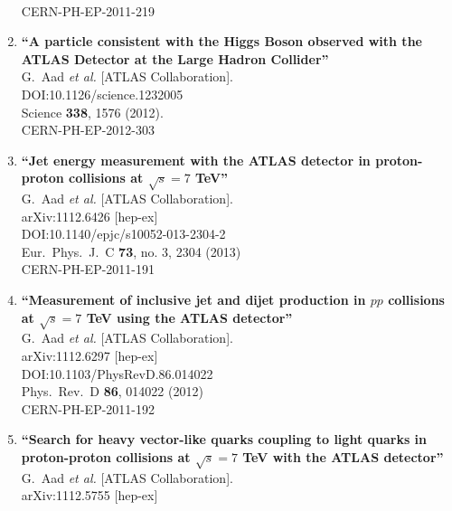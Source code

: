 \documentclass{article}
\begin{document}
\begin{enumerate}
  \\{}CERN-PH-EP-2011-219
\item%
{\bf ``A particle consistent with the Higgs Boson observed with the ATLAS Detector at the Large Hadron Collider''}
  \\{}G.~Aad {\it et al.} [ATLAS Collaboration].
  \\{}DOI:10.1126/science.1232005
  \\{}Science {\bf 338}, 1576 (2012).
  \\{}CERN-PH-EP-2012-303
\item%
{\bf ``Jet energy measurement with the ATLAS detector in proton-proton collisions at $\sqrt{s}=7$ TeV''}
  \\{}G.~Aad {\it et al.} [ATLAS Collaboration].
  \\{}arXiv:1112.6426 [hep-ex]
  \\{}DOI:10.1140/epjc/s10052-013-2304-2
  \\{}Eur.\ Phys.\ J.\ C {\bf 73}, no. 3, 2304 (2013)
  \\{}CERN-PH-EP-2011-191
\item%
{\bf ``Measurement of inclusive jet and dijet production in $pp$ collisions at $\sqrt{s}=7$ TeV using the ATLAS detector''}
  \\{}G.~Aad {\it et al.} [ATLAS Collaboration].
  \\{}arXiv:1112.6297 [hep-ex]
  \\{}DOI:10.1103/PhysRevD.86.014022
  \\{}Phys.\ Rev.\ D {\bf 86}, 014022 (2012)
  \\{}CERN-PH-EP-2011-192
\item%
{\bf ``Search for heavy vector-like quarks coupling to light quarks in proton-proton collisions at $\sqrt{s}=7$ TeV with the ATLAS detector''}
  \\{}G.~Aad {\it et al.} [ATLAS Collaboration].
  \\{}arXiv:1112.5755 [hep-ex]

\end{enumerate}
\end{document}
